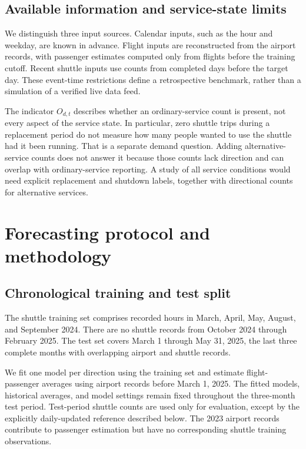 \documentclass[preprint,12pt,times]{elsarticle}
\begin{document}
\subsection{Available information and service-state limits}
We distinguish three input sources. Calendar inputs, such as the hour and weekday, are known in advance. Flight inputs are reconstructed from the airport records, with passenger estimates computed only from flights before the training cutoff. Recent shuttle inputs use counts from completed days before the target day. These event-time restrictions define a retrospective benchmark, rather than a simulation of a verified live data feed.

The indicator $O_{d,t}$ describes whether an ordinary-service count is present, not every aspect of the service state. In particular, zero shuttle trips during a replacement period do not measure how many people wanted to use the shuttle had it been running. That is a separate demand question. Adding alternative-service counts does not answer it because those counts lack direction and can overlap with ordinary-service reporting. A study of all service conditions would need explicit replacement and shutdown labels, together with directional counts for alternative services.

\section{Forecasting protocol and methodology}
\subsection{Chronological training and test split}
The shuttle training set comprises recorded hours in March, April, May, August, and September 2024. There are no shuttle records from October 2024 through February 2025. The test set covers March 1 through May 31, 2025, the last three complete months with overlapping airport and shuttle records.

We fit one model per direction using the training set and estimate flight-passenger averages using airport records before March 1, 2025. The fitted models, historical averages, and model settings remain fixed throughout the three-month test period. Test-period shuttle counts are used only for evaluation, except by the explicitly daily-updated reference described below. The 2023 airport records contribute to passenger estimation but have no corresponding shuttle training observations.
\end{document}
